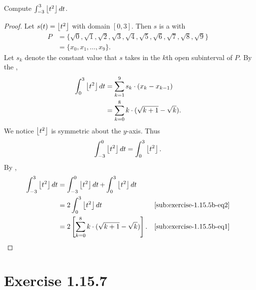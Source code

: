 \documentclass{report}
\begin{document}
\subsection{}%
\label{sub:exercise-1.15.5b}

Compute $\int_{-3}^3 \left\lfloor t^2\right\rfloor \mathop{dt}$.

\begin{proof}

  Let $s(t) = \left\lfloor t^2\right\rfloor$ with domain $[0, 3]$.
  Then $s$ is a  with 
    \begin{align*}
      P
        & = \{\sqrt{0}, \sqrt{1}, \sqrt{2}, \sqrt{3}, \sqrt{4}, \sqrt{5},
              \sqrt{6}, \sqrt{7}, \sqrt{8}, \sqrt{9}\} \\
        & = \{x_0, x_1, \ldots, x_9\}.
    \end{align*}
  Let $s_k$ denote the constant value that $s$ takes in the $k$th open
    subinterval of $P$.
  By the ,
    \begin{align}
      \int_0^3 \left\lfloor t^2\right\rfloor \mathop{dt}
        & = \sum_{k=1}^9 s_k \cdot (x_k - x_{k-1})
          \nonumber \\
        & = \sum_{k=0}^8 k \cdot (\sqrt{k + 1} - \sqrt{k}).
          \label{sub:exercise-1.15.5b-eq1}
    \end{align}
  We notice $\left\lfloor t^2\right\rfloor$ is symmetric about the $y$-axis.
  Thus
    \begin{equation}
      \label{sub:exercise-1.15.5b-eq2}
      \int_{-3}^0 \left\lfloor t^2\right\rfloor \mathop{dt} = \int_0^3 \left\lfloor t^2\right\rfloor.
    \end{equation}
  By ,
    \begin{align*}
      \int_{-3}^3 \left\lfloor t^2\right\rfloor \mathop{dt}
        & = \int_{-3}^0 \left\lfloor t^2\right\rfloor \mathop{dt} +
            \int_0^3 \left\lfloor t^2\right\rfloor \mathop{dt} \\
        & = 2\int_0^3 \left\lfloor t^2\right\rfloor \mathop{dt}
          & \eqref{sub:exercise-1.15.5b-eq2} \\
        & = 2 \left[\sum_{k=0}^8 k \cdot (\sqrt{k + 1} - \sqrt{k})\right].
          & \eqref{sub:exercise-1.15.5b-eq1}
    \end{align*}

\end{proof}

\section{Exercise 1.15.7}%
\label{sec:exercise-1.15.7}
\end{document}

